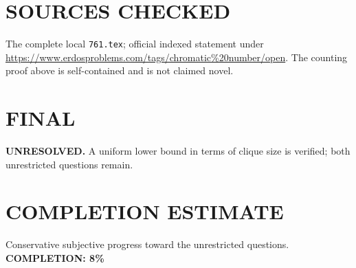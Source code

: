 \section{SOURCES CHECKED}
The complete local \texttt{761.tex}; official indexed statement under \url{https://www.erdosproblems.com/tags/chromatic\%20number/open}. The counting proof above is self-contained and is not claimed novel.
\section{FINAL}
\textbf{UNRESOLVED.} A uniform lower bound in terms of clique size is verified; both unrestricted questions remain.
\section{COMPLETION ESTIMATE}
Conservative subjective progress toward the unrestricted questions.
\textbf{COMPLETION: 8\%}
